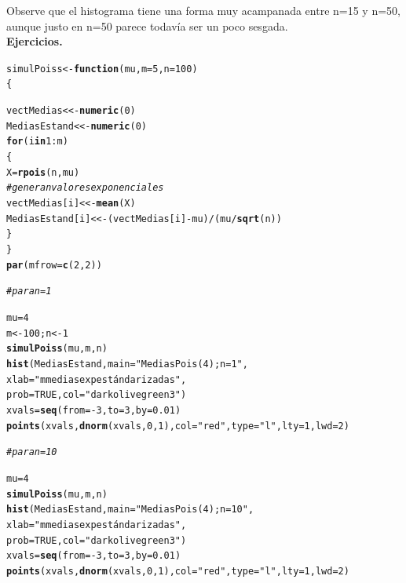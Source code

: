 \documentclass[12pt,letterpaper]{article}\usepackage[]{graphicx}\usepackage[]{color}
\makeatletter
\newcommand{\hlnum}[1]{\textcolor[rgb]{0.686,0.059,0.569}{#1}}%
\newcommand{\hlstr}[1]{\textcolor[rgb]{0.192,0.494,0.8}{#1}}%
\newcommand{\hlcom}[1]{\textcolor[rgb]{0.678,0.584,0.686}{\textit{#1}}}%
\newcommand{\hlopt}[1]{\textcolor[rgb]{0,0,0}{#1}}%
\newcommand{\hlstd}[1]{\textcolor[rgb]{0.345,0.345,0.345}{#1}}%
\newcommand{\hlkwa}[1]{\textcolor[rgb]{0.161,0.373,0.58}{\textbf{#1}}}%
\newcommand{\hlkwb}[1]{\textcolor[rgb]{0.69,0.353,0.396}{#1}}%
\newcommand{\hlkwc}[1]{\textcolor[rgb]{0.333,0.667,0.333}{#1}}%
\newcommand{\hlkwd}[1]{\textcolor[rgb]{0.737,0.353,0.396}{\textbf{#1}}}%
\newenvironment{kframe}{%
 \def\at@end@of@kframe{}%
 \ifinner\ifhmode%
  \def\at@end@of@kframe{\end{minipage}}%
  \begin{minipage}{\columnwidth}%
 \fi\fi%
 \def\FrameCommand##1{\hskip\@totalleftmargin \hskip-\fboxsep
 \colorbox{shadecolor}{##1}\hskip-\fboxsep
     \hskip-\linewidth \hskip-\@totalleftmargin \hskip\columnwidth}%
 \MakeFramed {\advance\hsize-\width
   \@totalleftmargin\z@ \linewidth\hsize
   \@setminipage}}%
 {\par\unskip\endMakeFramed%
 \at@end@of@kframe}
\newenvironment{knitrout}{}{} %
\makeatother
\begin{document}
\begin{enumerate}
\begin{knitrout}
\end{knitrout}

Observe que el histograma tiene una forma muy acampanada entre n=15 y n=50, aunque justo en n=50 parece todav\'ia ser un poco sesgada.\\

\textbf{Ejercicios.}
\begin{knitrout}
\color{fgcolor}\begin{kframe}
\begin{alltt}
\hlstd{simulPoiss} \hlkwb{<-} \hlkwa{function}\hlstd{(}\hlkwc{mu}\hlstd{,} \hlkwc{m}\hlstd{=}\hlnum{5}\hlstd{,} \hlkwc{n}\hlstd{=}\hlnum{100}\hlstd{)}
\hlstd{\{}

\hlstd{vectMedias} \hlkwb{<<-} \hlkwd{numeric}\hlstd{(}\hlnum{0}\hlstd{)}
\hlstd{MediasEstand} \hlkwb{<<-} \hlkwd{numeric}\hlstd{(}\hlnum{0}\hlstd{)}
\hlkwa{for} \hlstd{(i} \hlkwa{in} \hlnum{1}\hlopt{:}\hlstd{m)}
\hlstd{\{}
\hlstd{X} \hlkwb{=} \hlkwd{rpois}\hlstd{(n, mu)}
\hlcom{# genera n valores exponenciales }
\hlstd{vectMedias[i]} \hlkwb{<<-} \hlkwd{mean}\hlstd{(X)}
\hlstd{MediasEstand[i]} \hlkwb{<<-} \hlstd{(vectMedias[i]} \hlopt{-} \hlstd{mu)}\hlopt{/}\hlstd{(mu}\hlopt{/}\hlkwd{sqrt}\hlstd{(n))}
 \hlstd{\}}
\hlstd{\}}
\hlkwd{par}\hlstd{(}\hlkwc{mfrow}\hlstd{=}\hlkwd{c}\hlstd{(}\hlnum{2}\hlstd{,}\hlnum{2}\hlstd{))}

\hlcom{# para n=1 }

\hlstd{mu}\hlkwb{=}\hlnum{4}
\hlstd{m} \hlkwb{<-} \hlnum{100}\hlstd{; n} \hlkwb{<-} \hlnum{1}
\hlkwd{simulPoiss}\hlstd{(mu, m, n)}
\hlkwd{hist}\hlstd{(MediasEstand,} \hlkwc{main}\hlstd{=}\hlstr{"Medias Pois(4); n=1"}\hlstd{,}
     \hlkwc{xlab}\hlstd{=}\hlstr{"m medias exp estándarizadas"}\hlstd{,}
\hlkwc{prob}\hlstd{=}\hlnum{TRUE}\hlstd{,} \hlkwc{col}\hlstd{=}\hlstr{"darkolivegreen3"}\hlstd{)}
\hlstd{xvals} \hlkwb{=} \hlkwd{seq}\hlstd{(}\hlkwc{from}\hlstd{=}\hlopt{-}\hlnum{3}\hlstd{,} \hlkwc{to}\hlstd{=}\hlnum{3}\hlstd{,} \hlkwc{by}\hlstd{=}\hlnum{0.01}\hlstd{)}
\hlkwd{points}\hlstd{(xvals,} \hlkwd{dnorm}\hlstd{(xvals,} \hlnum{0}\hlstd{,} \hlnum{1}\hlstd{),} \hlkwc{col} \hlstd{=} \hlstr{"red"}\hlstd{,} \hlkwc{type}\hlstd{=}\hlstr{"l"}\hlstd{,} \hlkwc{lty}\hlstd{=}\hlnum{1}\hlstd{,} \hlkwc{lwd}\hlstd{=}\hlnum{2}\hlstd{)}

\hlcom{# para n=10}

\hlstd{mu}\hlkwb{=}\hlnum{4}
\hlkwd{simulPoiss}\hlstd{(mu, m, n)}
\hlkwd{hist}\hlstd{(MediasEstand,} \hlkwc{main}\hlstd{=}\hlstr{"Medias Pois(4); n=10"}\hlstd{,}
     \hlkwc{xlab}\hlstd{=}\hlstr{"m medias exp estándarizadas"}\hlstd{,}
\hlkwc{prob}\hlstd{=}\hlnum{TRUE}\hlstd{,} \hlkwc{col}\hlstd{=}\hlstr{"darkolivegreen3"}\hlstd{)}
\hlstd{xvals} \hlkwb{=} \hlkwd{seq}\hlstd{(}\hlkwc{from}\hlstd{=}\hlopt{-}\hlnum{3}\hlstd{,} \hlkwc{to}\hlstd{=}\hlnum{3}\hlstd{,} \hlkwc{by}\hlstd{=}\hlnum{0.01}\hlstd{)}
\hlkwd{points}\hlstd{(xvals,} \hlkwd{dnorm}\hlstd{(xvals,} \hlnum{0}\hlstd{,} \hlnum{1}\hlstd{),} \hlkwc{col} \hlstd{=} \hlstr{"red"}\hlstd{,} \hlkwc{type}\hlstd{=}\hlstr{"l"}\hlstd{,} \hlkwc{lty}\hlstd{=}\hlnum{1}\hlstd{,} \hlkwc{lwd}\hlstd{=}\hlnum{2}\hlstd{)}


\end{alltt}
\end{kframe}
\end{knitrout}
\end{enumerate}
\end{document}
